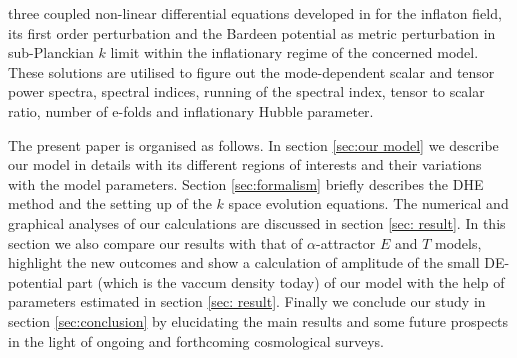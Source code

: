 \documentclass[a4paper,11pt]{article}
\begin{document}
three coupled non-linear differential equations developed in \cite{Sarkar:2021ird} for the inflaton field, its first order perturbation and the Bardeen potential as metric perturbation in sub-Planckian $k$ limit within the inflationary regime of the concerned model. These solutions are utilised to figure out the mode-dependent scalar and tensor power spectra, spectral indices, running of the spectral index, tensor to scalar ratio, number of e-folds and inflationary Hubble parameter. \par The present paper is organised as follows. In section \ref{sec:our model} we describe our model in details with its different regions of interests and their variations with the model parameters. Section \ref{sec:formalism} briefly describes the DHE method and the setting up of the $k$ space evolution equations. The numerical and graphical analyses of our calculations are discussed in section \ref{sec: result}. In this section we also compare our results with that of $\alpha$-attractor $E$ and $T$ models, highlight the new outcomes and show a calculation of amplitude of the small DE-potential part (which is the vaccum density today) of our model with the help of parameters estimated in section \ref{sec: result}. Finally we conclude our study in section \ref{sec:conclusion} by elucidating the main results and some future prospects in the light of ongoing and forthcoming cosmological surveys. 
\end{document}
